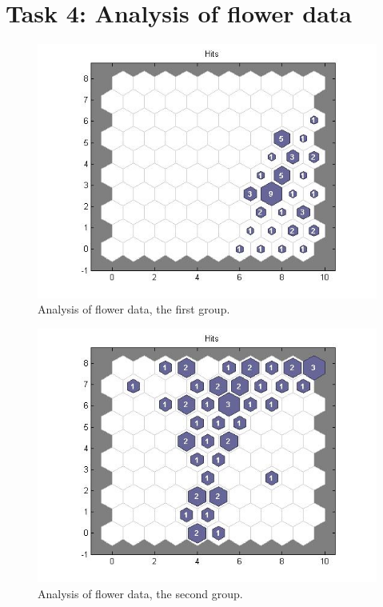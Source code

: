 \documentclass[a4paper]{article}
\begin{document}
\section*{Task 4: Analysis of flower data}

 \begin{figure}[H] %
	 \includegraphics[scale=0.5]{q4_plotsom1_50.jpg}
	 \caption{\label{fig:plotg1} Analysis of flower data, the first group.}
 \end{figure}
  \begin{figure}[H] %
	 \includegraphics[scale=0.5]{q4_plotsom50_100.jpg}
	 \caption{\label{fig:plotg2} Analysis of flower data, the second group.}
 \end{figure}
\end{document}
